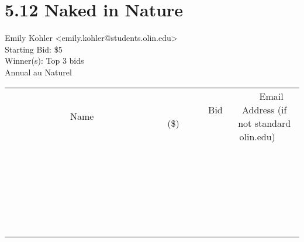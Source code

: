 \documentclass[11pt]{article}
\begin{document}
					\section*{5.12 Naked in Nature}
					Emily Kohler <emily.kohler@students.olin.edu> \\
					Starting Bid: \$5 \\
					Winner(s): Top 3 bids \\
					Annual au Naturel \\
					[6ex]
					\begin{tabular}{c c c}
						~~~~~~~~~~~~~Name~~~~~~~~~~~~~ & ~~~~~~~~~Bid (\$)~~~~~~~~~ & ~~~Email Address (if not standard olin.edu)~~~ \\
				
 & & \\
\hline
 & & \\
\hline
 & & \\
\hline
 & & \\
\hline
 & & \\
\hline
 & & \\
\hline
 & & \\
\hline
 & & \\
\hline
 & & \\
\hline
 & & \\
\hline
 & & \\
\hline
 & & \\
\hline
 & & \\
\hline
 & & \\
\hline
 & & \\
\hline
 & & \\
\hline
 & & \\
\hline
 & & \\
\hline
 & & \\
\hline
 & & \\
\hline
 & & \\
\hline
 & & \\
\hline
 & & \\
\hline
 & & \\
\hline
 & & \\
\hline
 & & \\
\hline
					\end{tabular}
					\clearpage
				
\end{document}
